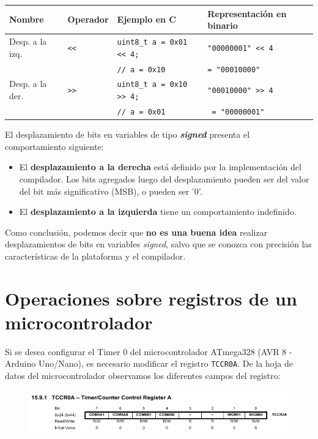 \documentclass[paper=a4, fontsize=11pt]{scrartcl}	%
\numberwithin{equation}{section} %
\numberwithin{figure}{section} %
\numberwithin{table}{section} %
\begin{document}
\begin{table}[h]
  \centering
  \small
  \begin{tabular}{l | l | l | l}
    \hline
    \textbf{Nombre} & \textbf{Operador} & \textbf{Ejemplo en C} & \textbf{Representación en binario} \\ \hline
    Desp. a la izq. & \verb!<<! & \verb!uint8_t a = 0x01 << 4;! & \verb!"00000001" << 4! \\
    & & \verb!// a = 0x10! &\verb!= "00010000"! \\ \hline
    Desp. a la der. & \verb!>>! & \verb!uint8_t a = 0x10 >> 4;!  & \verb!"00010000" >> 4!\\
    & & \verb!// a = 0x01! &  \verb! = "00000001"! \\ \hline
  \end{tabular}
\end{table}

El desplazamiento de bits en variables de tipo \textbf{\emph{signed}} presenta el
comportamiento siguiente:
\begin{itemize}
  \item El \textbf{desplazamiento a la derecha} está definido por la
    implementación del compilador. Los bits agregados luego del
    desplazamiento pueden ser del valor del
    bit más significativo (MSB), o pueden ser '0'.
  \item El \textbf{desplazamiento a la izquierda} {\color{red}tiene un
    comportamiento indefinido}.
\end{itemize}

Como conclusión, podemos decir que \textbf{no es una buena idea}
realizar desplazamientos de bits en variables \emph{signed}, salvo que
se conozca con precisión las características de la plataforma y el
compilador.

\section{Operaciones sobre registros de un microcontrolador}

Si se desea configurar el Timer 0 del microcontrolador ATmega328 (AVR
8 - Arduino Uno/Nano), es necesario modificar el registro \verb|TCCR0A|. De la hoja de datos del
microcontrolador observamos los diferentes campos del registro:

\begin{figure}[h]
  \includegraphics[width=\textwidth]{ATMEGA-timer.png}
\end{figure}
\end{document}
